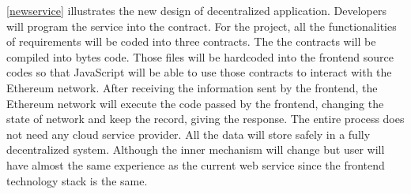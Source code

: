 \documentclass[openany,12pt]{ecsthesis}      %
\begin{document}
\ref{newservice} illustrates the new design of decentralized application. Developers will program the service into the contract. 
For the project, all the functionalities of requirements will be coded into three contracts. The the contracts will be compiled into bytes code. 
Those files will be hardcoded into the frontend source codes so that JavaScript will be able to use those contracts to interact with the Ethereum network.
After receiving the information sent by the frontend, the Ethereum network will execute the code passed by the frontend, 
changing the state of network and keep the record, 
giving the response. The entire process does not need any cloud service provider. 
All the data will store safely in a fully decentralized system. 
Although the inner mechanism will change 
but user will have almost the same experience as the current web service 
since the frontend technology stack is the same.
\end{document}
